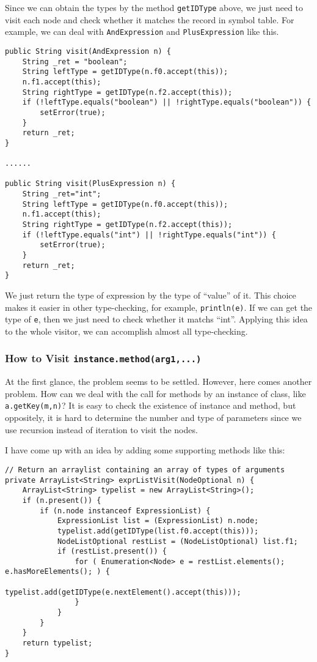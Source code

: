 \documentclass[letterpaper, 14pt]{article}
\begin{document}
Since we can obtain the types by the method \texttt{getIDType} above, we just need to visit each node and check whether it matches the record in symbol table. For example, we can deal with \texttt{AndExpression} and \texttt{PlusExpression} like this. 
\begin{lstlisting}
public String visit(AndExpression n) {
	String _ret = "boolean";
	String leftType = getIDType(n.f0.accept(this));
	n.f1.accept(this);
	String rightType = getIDType(n.f2.accept(this));
	if (!leftType.equals("boolean") || !rightType.equals("boolean")) {
		setError(true);
	}
	return _ret;
}

......

public String visit(PlusExpression n) {
	String _ret="int";
	String leftType = getIDType(n.f0.accept(this));
	n.f1.accept(this);
	String rightType = getIDType(n.f2.accept(this));
	if (!leftType.equals("int") || !rightType.equals("int")) {
		setError(true);
	}
	return _ret;
}
\end{lstlisting}

We just return the type of expression by the type of ``value'' of it. This choice makes it easier in other type-checking, for example, \texttt{println(e)}. If we can get the type of \texttt{e}, then we just need to check whether it matchs ``int''. Applying this idea to the whole visitor, we can accomplish almost all type-checking. 

\subsubsection{How to Visit \texttt{instance.method(arg1,...)}}

At the first glance, the problem seems to be settled. However, here comes another problem. How can we deal with the call for methods by an instance of class, like \texttt{a.getKey(m,n)}? It is easy to check the existence of instance and method, but oppositely, it is hard to determine the number and type of parameters since we use recursion instead of iteration to visit the nodes. 

I have come up with an idea by adding some supporting methods like this:
\begin{lstlisting}
// Return an arraylist containing an array of types of arguments
private ArrayList<String> exprListVisit(NodeOptional n) {
	ArrayList<String> typelist = new ArrayList<String>();
	if (n.present()) {
		if (n.node instanceof ExpressionList) {
			ExpressionList list = (ExpressionList) n.node;
			typelist.add(getIDType(list.f0.accept(this)));
			NodeListOptional restList = (NodeListOptional) list.f1;
			if (restList.present()) {
				for ( Enumeration<Node> e = restList.elements(); e.hasMoreElements(); ) {
					typelist.add(getIDType(e.nextElement().accept(this)));
				}
			}
		}
	}
	return typelist;
}
\end{lstlisting}
\end{document}
